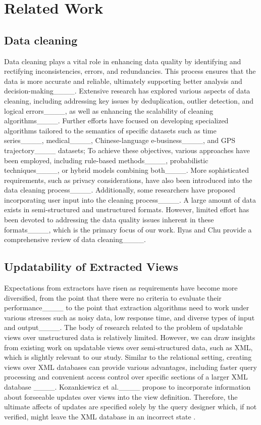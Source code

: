 \section{Related Work}
\subsection{Data cleaning}
Data cleaning plays a vital role in enhancing data quality by identifying and rectifying inconsistencies, errors, and redundancies. This process ensures that the data is more accurate and reliable, ultimately supporting better analysis and  decision-making____.   Extensive research has explored various aspects of data cleaning, including addressing key issues by  deduplication, outlier detection, and logical errors____, as well as enhancing the scalability of cleaning algorithms____. Further efforts have focused on developing specialized algorithms tailored to the semantics of specific datasets such as time series____, medical____, Chinese-language e-business____, and GPS  trajectory____ datasets; To achieve these objectives, various approaches have been employed, including  rule-based methods____, probabilistic techniques____, or hybrid models combining both____. More sophisticated requirements, such as privacy considerations, have also been introduced into the data cleaning process____. Additionally, some researchers have proposed incorporating user input into the cleaning process____. A large amount of data exists in semi-structured and unstructured formats. However, limited effort has been devoted to addressing the data quality issues inherent in these formats____, which is the primary focus of our work.   Ilyas and Chu provide a comprehensive review of data cleaning____.



\subsection{Updatability of Extracted Views} 

Expectations from extractors have risen as requirements have become more diversified, from the point that there were no  criteria to evaluate their performance____ to the point that extraction algorithms need to work under various stresses such as noisy data, low response time, and diverse types of input and output____. The body of research related to the problem of updatable views over unstructured data is relatively limited. However, we can draw insights from existing work on updatable views over semi-structured data, such as XML, which is slightly relevant to our study. Similar to the relational setting, creating views over XML databases can provide various advantages, including faster query processing and convenient access control over specific sections of a larger XML database ____. Kozankiewicz et al.____ propose to incorporate  information about forseeable updates over views into the  view definition. Therefore,  the ultimate affects of updates are specified solely by the query designer which, if not verified, might leave the XML database in an incorrect state .  
